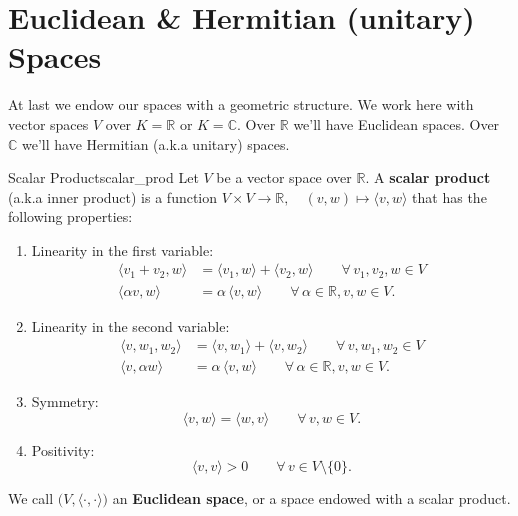% 
%
%
%

\section{Euclidean \& Hermitian (unitary) Spaces}
At last we endow our spaces with a geometric structure. We work here with vector spaces $V$ over $K = \mathbb{R}$ or $K = \mathbb{C}$. Over $\mathbb{R}$ we'll have Euclidean spaces. Over $\mathbb{C}$ we'll have Hermitian (a.k.a unitary) spaces.

\begin{definition}{Scalar Product}{scalar_prod}
	Let $V$ be a vector space over $\mathbb{R}$. A \textbf{scalar product} (a.k.a inner product) is a function $V \times V \to \mathbb{R}, \quad (v, w) \mapsto \langle v, w\rangle$ that has the following properties:
	\begin{enumerate}
		\item Linearity in the first variable:
		\begin{align*}
			\langle v_1 + v_2, w\rangle &= \langle v_1, w\rangle + \langle v_2, w\rangle \qquad \forall \, v_1, v_2, w \in V\\
			\langle \alpha v, w\rangle &= \alpha \, \langle v, w\rangle \qquad \forall\, \alpha \in \mathbb{R}, v, w \in V. 
		\end{align*}
		\item Linearity in the second variable:
		\begin{align*}
			\langle v, w_1, w_2\rangle &= \langle v, w_1\rangle + \langle v, w_2\rangle \qquad \forall \, v, w_1, w_2 \in V\\
			\langle v, \alpha w\rangle &= \alpha \, \langle v, w\rangle \qquad \forall\, \alpha \in \mathbb{R}, v, w \in V. 
		\end{align*}
		\item Symmetry:
		\[
			\langle v, w \rangle = \langle w, v \rangle \qquad \forall \, v, w \in V.
		\]
		\item Positivity:
		\[
			\langle v, v \rangle > 0 \qquad \forall \, v \in V \setminus \{0\}.
		\]
	\end{enumerate}
	
	We call $\big(V, \langle \cdot , \cdot \rangle\big)$ an \textbf{Euclidean space}, or a space endowed with a scalar product.
\end{definition}

